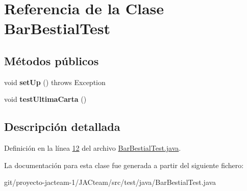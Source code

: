 \hypertarget{class_bar_bestial_test}{}\section{Referencia de la Clase Bar\+Bestial\+Test}
\label{class_bar_bestial_test}
\subsection*{Métodos públicos}
\begin{DoxyCompactItemize}
\item 
\mbox{\label{class_bar_bestial_test_a0fd12592c0a679f0991ca41418482b0e}} 
void {\bfseries set\+Up} ()  throws Exception 
\item 
\mbox{\label{class_bar_bestial_test_ab8d93dfc00df402241862fb161df7ca1}} 
void {\bfseries test\+Ultima\+Carta} ()
\end{DoxyCompactItemize}


\subsection{Descripción detallada}


Definición en la línea \mbox{\hyperlink{_bar_bestial_test_8java_source_l00012}{12}} del archivo \mbox{\hyperlink{_bar_bestial_test_8java_source}{Bar\+Bestial\+Test.\+java}}.



La documentación para esta clase fue generada a partir del siguiente fichero\+:\begin{DoxyCompactItemize}
\item 
git/proyecto-\/jacteam-\/1/\+J\+A\+Cteam/src/test/java/Bar\+Bestial\+Test.\+java\end{DoxyCompactItemize}
